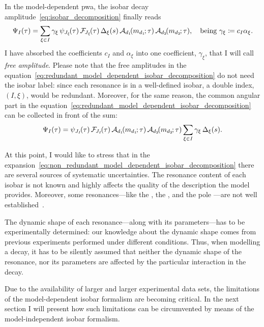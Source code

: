     In the model-dependent \ac{pwa}, the isobar decay amplitude~\eqref{eq:isobar_decomposition} finally reads
    \begin{equation}\label{eq:redundant_model_dependent_isobar_decomposition}
        \Psi_I(\tau) =  \sum_{\xi\in I} \gamma_\xi \,\psi_{J_\xi\!}(\tau)\,\mathcal{F\!}_{J_\xi\!}(\tau)\,\Delta_{\xi}(s)\,\mathcal{A}_{d_1}\!(m_{d_1\!}; \tau)\,\mathcal{A}_{d_2}\!(m_{d_2\!}; \tau),\quad
        \text{being }
        \gamma_\xi\coloneqq c_I \alpha_{\xi}.
    \end{equation}
    I have absorbed the coefficients $c_I$ and $\alpha_\xi$ into one coefficient, $\gamma_{\xi}$, that I will call \emph{free amplitude}.
    Please note that the free amplitudes in the equation~\eqref{eq:redundant_model_dependent_isobar_decomposition} do not need the isobar label: since each resonance is in a well-defined isobar, a double index, $(I,\xi)$, would be redundant.
    Moreover, for the same reason, the common angular part in the equation~\eqref{eq:redundant_model_dependent_isobar_decomposition} can be collected in front of the sum:
    \begin{equation}\label{eq:non_redundant_model_dependent_isobar_decomposition}
        \Psi_I(\tau) =  \psi_{J_I\!}(\tau)\,\mathcal{F\!}_{J_I\!}(\tau)\,\mathcal{A}_{d_1}\!(m_{d_1\!}; \tau)\,\mathcal{A}_{d_2}\!(m_{d_2\!}; \tau)\sum_{\xi\in I} \gamma_\xi \,\Delta_{\xi}(s).
    \end{equation}


    At this point, I would like to stress that in the expansion~\eqref{eq:non_redundant_model_dependent_isobar_decomposition} there are several sources of systematic uncertainties.
    The resonance content of each isobar is not known and highly affects the quality of the description the model provides.
    Moreover, some resonances---like the \Pfnez{}, the \Pfotsz, and the pole \Psigma{}---are not well established~\cite[\S~B]{PhysRevD.76.012001}.


    The dynamic shape of each resonance---along with its parameters---has to be experimentally determined: our knowledge about the dynamic shape comes from previous experiments performed under different conditions.
    Thus, when modelling a decay, it has to be silently assumed that neither the dynamic shape of the resonance, nor its parameters are affected by the particular interaction in the decay.


    Due to the availability of larger and larger experimental data sets, the limitations of the model-dependent isobar formalism are becoming critical.
    In the next section I will present how such limitations can be circumvented by means of the model-independent isobar formalism.


